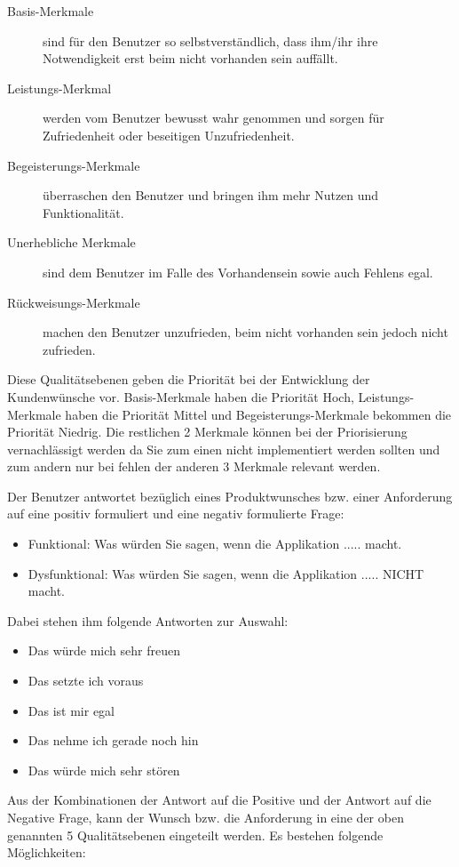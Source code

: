 \begin{description}
  \item[Basis-Merkmale] sind für den Benutzer so selbstverständlich, dass ihm/ihr ihre Notwendigkeit erst beim nicht vorhanden sein auffällt.
  \item[Leistungs-Merkmal] werden vom Benutzer bewusst wahr genommen und sorgen für Zufriedenheit oder beseitigen Unzufriedenheit.
  \item[Begeisterungs-Merkmale] überraschen den Benutzer und bringen ihm mehr Nutzen und Funktionalität.
  \item[Unerhebliche Merkmale] sind dem Benutzer im Falle des Vorhandensein sowie auch Fehlens egal.
  \item[Rückweisungs-Merkmale] machen den Benutzer unzufrieden, beim nicht vorhanden sein jedoch nicht zufrieden.
\end{description}

Diese Qualitätsebenen geben die Priorität bei der Entwicklung der Kundenwünsche vor. Basis-Merkmale haben die Priorität Hoch, Leistungs-Merkmale haben die Priorität Mittel und Begeisterungs-Merkmale bekommen die Priorität Niedrig. Die restlichen 2 Merkmale können bei der Priorisierung vernachlässigt werden da Sie zum einen nicht implementiert werden sollten und zum andern nur bei fehlen der anderen 3 Merkmale relevant werden.

Der Benutzer antwortet bezüglich eines Produktwunsches bzw. einer Anforderung auf eine positiv formuliert und eine negativ formulierte Frage:
\begin{itemize}
  \item Funktional: Was würden Sie sagen, wenn die Applikation ..... macht.
  \item Dysfunktional: Was würden Sie sagen, wenn die Applikation ..... NICHT macht.
\end{itemize}

Dabei stehen ihm folgende Antworten zur Auswahl:

\begin{itemize}
  \item Das würde mich sehr freuen
  \item Das setzte ich voraus
  \item Das ist mir egal
  \item Das nehme ich gerade noch hin
  \item Das würde mich sehr stören
\end{itemize}

Aus der Kombinationen der Antwort auf die Positive und der Antwort auf die Negative Frage, kann der Wunsch bzw. die Anforderung in eine der oben genannten 5 Qualitätsebenen eingeteilt werden. Es bestehen folgende Möglichkeiten:

